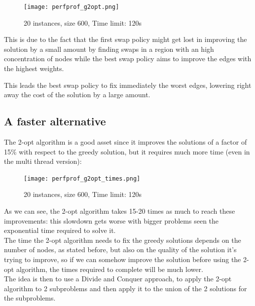 \begin{figure}[h]
    \centering
    \texttt{[image: perfprof\_g2opt.png]}
    \caption*{20 instances, size 600, Time limit: 120s}
\end{figure}

This is due to the fact that the first swap policy might get lost in improving the solution by a small amount by finding swaps in a region with an high concentration of nodes while the best swap policy aims to improve the edges with the highest weights.

This leads the best swap policy to fix immediately the worst edges, lowering right away the cost of the solution by a large amount.

\subsection{A faster alternative}

The 2-opt algorithm is a good asset since it improves the solutions of a factor of 15\% with respect to the greedy solution, but it requires much more time (even in the multi thread version):
\begin{figure}[h]
    \centering
    \texttt{[image: perfprof\_g2opt\_times.png]}
    \caption*{20 instances, size 600, Time limit: 120s}
\end{figure}

As we can see, the 2-opt algorithm takes 15-20 times as much to reach these improvements: this slowdown gets worse with bigger problems seen the exponential time required to solve it.\\

The time the 2-opt algorithm needs to fix the greedy solutions depends on the number of nodes, as stated before, but also on the quality of the solution it's trying to improve, so if we can somehow improve the solution before using the 2-opt algorithm, the times required to complete will be much lower.\\

The idea is then to use a Divide and Conquer approach, to apply the 2-opt algorithm to 2 subproblems and then apply it to the union of the 2 solutions for the subproblems.\\

\newpage
